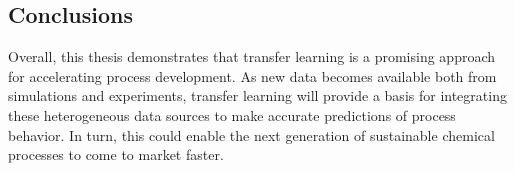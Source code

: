\subsection{Conclusions}

Overall, this thesis demonstrates that transfer learning is a promising approach for accelerating process development. As new data becomes available both from simulations and experiments, transfer learning will provide a basis for integrating these heterogeneous data sources to make accurate predictions of process behavior. In turn, this could enable the next generation of sustainable chemical processes to come to market faster.